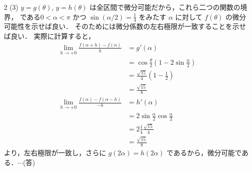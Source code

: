\documentclass[../../../../main.tex]{subfiles}
\begin{document}
\begin{multicols}{2}
    \vspace{10pt}
    (3)
    $y = g(\theta)$, $y = h(\theta)$ は全区間で微分可能だから，これら二つの関数の境界，
    である$0 < \alpha < \pi$ かつ $\sin(\alpha/2) = \frac{1}{4}$ をみたす $\alpha$ に対して
    $f(\theta)$ の微分可能性を示せば良い．
    そのためには微分係数の左右極限が一致することを示せば良い．
    実際に計算すると，
    \begin{align*}
        \lim_{h \to +0} \frac{f(\alpha+h) - f(\alpha)}{h}
         & = g'(\alpha)                                               \\
         & = \cos\frac{\theta}{2}\left(1-2\sin\frac{\alpha}{2}\right) \\
         & = \frac{\sqrt{15}}{4}\left(1-\frac{1}{2}\right)            \\
         & = \frac{\sqrt{15}}{8}                                      \\
        \lim_{h \to +0} \frac{f(\alpha) - f(\alpha-h)}{-h}
         & = h'(\alpha)                                               \\
         & = 2\sin\frac{\alpha}{2}\cos\frac{\alpha}{2}                \\
         & = 2\frac{1}{4}\frac{\sqrt{15}}{4}                          \\
         & = \frac{\sqrt{15}}{8}
    \end{align*}
    より，左右極限が一致し，さらに $g(2\alpha) = h(2\alpha)$ であるから，微分可能である．$\cdots$(答)


\end{multicols}
\end{document}
